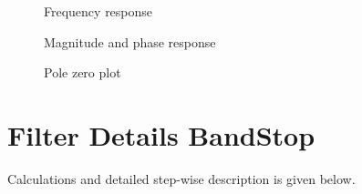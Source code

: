 \documentclass[12pt, letterpaper,]{article}
\begin{document}
\begin{itemize}
\begin{figure}[!ht]
\centering
\vspace{-3mm}
\caption{Frequency response}
\end{figure}
\begin{figure}[!ht]
\centering
\vspace{-3mm}
\caption{Magnitude and phase response}
\end{figure}
\begin{figure}[!ht]
\centering
\vspace{-3mm}
\caption{Pole zero plot}
\end{figure}
\newpage
\end{itemize}


\section{Filter Details BandStop} %

Calculations and detailed step-wise description is given below.
\end{document}
